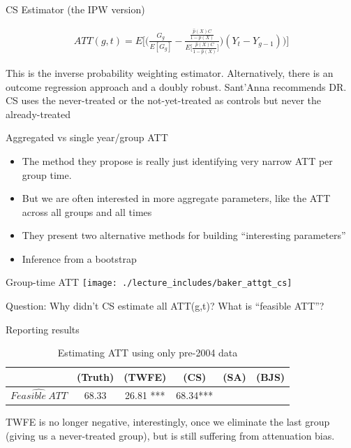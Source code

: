 \documentclass{beamer}
\begin{document}
\begin{frame}{CS Estimator (the IPW version)}

\begin{eqnarray*}
ATT(g,t) = E \bigg [ \bigg ( \frac{G_g}{E[G_g]} - \frac{ \frac{\hat{p}(X)C}{1-\hat{p}(X)}}{E \bigg [ \frac{\hat{p}(X)C}{1-\hat{p}(X)} \bigg ]} \bigg ) (Y_t - Y_{g-1} ) \bigg ) \bigg ]
\end{eqnarray*}

This is the inverse probability weighting estimator.  Alternatively, there is an outcome regression approach and a doubly robust. Sant'Anna recommends DR.  CS uses the never-treated or the not-yet-treated as controls but never the already-treated 
\end{frame}




\begin{frame}{Aggregated vs single year/group ATT}

\begin{itemize}
\item The method they propose is really just identifying very narrow ATT per group time.
\item But we are often interested in  more aggregate parameters, like the ATT across all groups and all times
\item They present two alternative methods for building ``interesting parameters'' 
\item Inference from a bootstrap
\end{itemize}


\end{frame}



\begin{frame}{Group-time ATT }
             \texttt{[image: ./lecture\_includes/baker\_attgt\_cs]}

Question: Why didn't CS estimate all ATT(g,t)? What is ``feasible ATT''?

\end{frame}

\begin{frame}{Reporting results}
\begin{table}[htbp]\centering
\small
\caption{Estimating ATT using only pre-2004 data}
\begin{center}
\begin{tabular}{l*{5}{c}}
\hline
\multicolumn{1}{l}{\textbf{}}&
\multicolumn{1}{c}{\textbf{(Truth)}}&
\multicolumn{1}{c}{\textbf{(TWFE)}}&
\multicolumn{1}{c}{\textbf{(CS)}}&
\multicolumn{1}{c}{\textbf{(SA)}}&
\multicolumn{1}{c}{\textbf{(BJS)}}\\
\hline
$\widehat{Feasible\ ATT}$  & 68.33    & 26.81 *** & 68.34*** &&\\
\hline
\end{tabular}
\end{center}
\end{table}

TWFE is no longer negative, interestingly, once we eliminate the last group (giving us a never-treated group), but is still suffering from attenuation bias. 

\end{frame}
\end{document}
